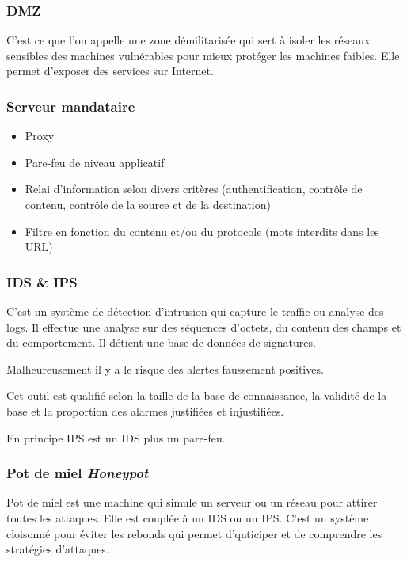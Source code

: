 \documentclass[12pt, a4paper]{article}
\begin{document}
	\subsubsection{DMZ}
	C'est ce que l'on appelle une zone démilitarisée qui sert à isoler les réseaux sensibles des machines vulnérables pour mieux protéger les machines faibles. Elle permet d'exposer des services sur Internet.
	\subsubsection{Serveur mandataire}
	\begin{itemize}
		\item Proxy
		\item Pare-feu de niveau applicatif
		\item Relai d'information selon divers critères (authentification, contrôle de contenu, contrôle de la source et de la destination)
		\item Filtre en fonction du contenu et/ou du protocole (mots interdits dans les URL)
	\end{itemize}
	\subsubsection{IDS \& IPS}
	C'est un système de détection d'intrusion qui capture le traffic ou analyse des logs. Il effectue une analyse sur des séquences d'octets, du contenu des champs et du comportement. Il détient une base de données de signatures.
	\par
	Malheureusement il y a le risque des alertes faussement positives. 
	\par
	Cet outil est qualifié selon la taille de la base de connaissance, la validité de la base et la proportion des alarmes justifiées et injustifiées.
	\par
	En principe IPS est un IDS plus un pare-feu.
	\subsubsection{Pot de miel \textit{Honeypot}}
	Pot de miel est une machine qui simule un serveur ou un réseau pour attirer toutes les attaques. Elle est couplée à un IDS ou un IPS. C'est un système cloisonné pour éviter les rebonds qui permet d'qnticiper et de comprendre les stratégies d'attaques.
\end{document}
